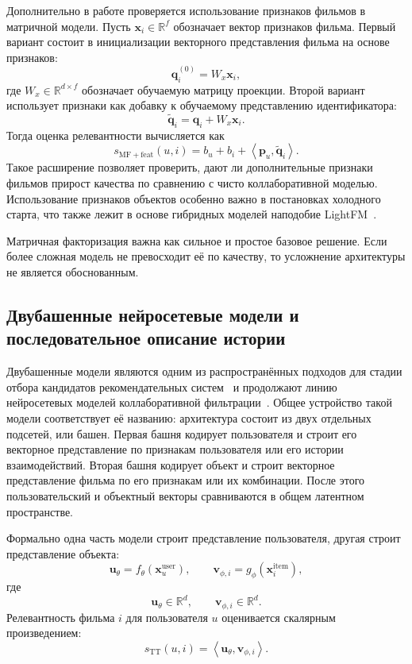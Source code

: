 \documentclass[12pt,fleqn]{article}
\begin{document}
Дополнительно в работе проверяется использование признаков фильмов в матричной
модели. Пусть $\mathbf{x}_i\in\mathbb{R}^{f}$ обозначает вектор признаков фильма.
Первый вариант состоит в инициализации векторного представления фильма на основе признаков:
$$
    \mathbf{q}_i^{(0)}=
    W_x\mathbf{x}_i,
$$
где $W_x\in\mathbb{R}^{d\times f}$ обозначает обучаемую матрицу
проекции. Второй вариант использует признаки как добавку к обучаемому
представлению идентификатора:
$$
    \widetilde{\mathbf{q}}_i=
    \mathbf{q}_i+
    W_x\mathbf{x}_i.
$$
Тогда оценка релевантности вычисляется как
$$
    s_{\mathrm{MF+feat}}(u,i)=
    b_u+b_i+
    \left\langle
        \mathbf{p}_u,
        \widetilde{\mathbf{q}}_i
    \right\rangle.
$$
Такое расширение позволяет проверить, дают ли дополнительные признаки фильмов
прирост качества по сравнению с чисто коллаборативной моделью. Использование признаков объектов особенно важно в постановках холодного старта, что также лежит в основе гибридных моделей наподобие LightFM~\cite{kula2015lightfm}.

Матричная факторизация важна как сильное и простое базовое решение. Если более
сложная модель не превосходит её по качеству, то усложнение архитектуры не
является обоснованным.

\subsection{Двубашенные нейросетевые модели и последовательное описание истории}

Двубашенные модели являются одним из распространённых подходов для
стадии отбора кандидатов рекомендательных систем~\cite{covington2016youtube} и
продолжают линию нейросетевых моделей коллаборативной
фильтрации~\cite{he2017ncf}. Общее устройство такой модели соответствует её
названию: архитектура состоит из двух отдельных подсетей, или башен. Первая
башня кодирует пользователя и строит его векторное представление по признакам
пользователя или его истории взаимодействий. Вторая башня кодирует объект и
строит векторное представление фильма по его признакам или их
комбинации. После этого пользовательский и объектный векторы сравниваются в
общем латентном пространстве.

Формально одна часть модели строит представление пользователя, другая строит
представление объекта:
$$
    \mathbf{u}_{\theta}
    =
    f_{\theta}
    \left(
        \mathbf{x}^{\mathrm{user}}_u
    \right),
    \qquad
    \mathbf{v}_{\phi,i}
    =
    g_{\phi}
    \left(
        \mathbf{x}^{\mathrm{item}}_i
    \right),
$$
где
$$
    \mathbf{u}_{\theta}\in\mathbb{R}^{d},
    \qquad
    \mathbf{v}_{\phi,i}\in\mathbb{R}^{d}.
$$
Релевантность фильма $i$ для пользователя $u$ оценивается скалярным
произведением:
$$
    s_{\mathrm{TT}}(u,i)
    =
    \left\langle
        \mathbf{u}_{\theta},
        \mathbf{v}_{\phi,i}
    \right\rangle.
$$
\end{document}
